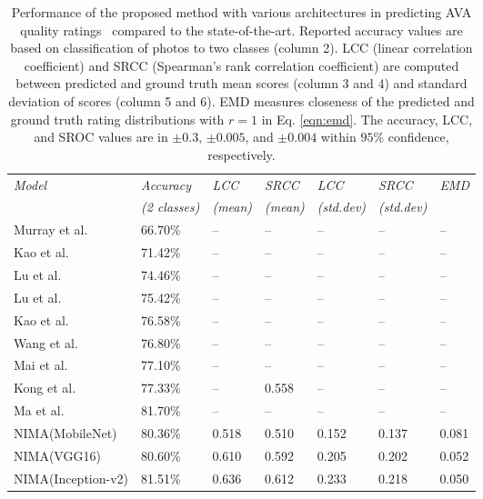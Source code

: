 \documentclass[10pt,twocolumn,twoside]{IEEEtran}
\begin{document}
\begin{table*}[!t]
\vspace{12 mm}
\begin{center}
\captionsetup{width=0.57\textwidth}
\caption{Performance of the proposed method with various architectures in predicting AVA quality ratings~\cite{murray2012ava} compared to the state-of-the-art. Reported accuracy values are based on classification of photos to two classes (column 2). LCC (linear correlation coefficient) and SRCC (Spearman's rank correlation coefficient) are computed between predicted and ground truth mean scores (column 3 and 4) and standard deviation of scores (column 5 and 6). EMD measures closeness of the predicted and ground truth rating distributions with $r=1$ in Eq. \ref{eqn:emd}. The accuracy, LCC, and SROC values are in $\pm0.3$,  $\pm0.005$, and $\pm0.004$ within $95\%$ confidence, respectively.}
\begin{tabular}{@{} *7l @{}}    \toprule
\emph{Model} & \emph{Accuracy} & \emph{LCC} & \emph{SRCC} & \emph{LCC} & \emph{SRCC} & \emph{EMD} \\
  & \emph{(2 classes)} & \emph{(mean)} & \emph{(mean)} & \emph{(std.dev)} & \emph{(std.dev)}\\\midrule
Murray et al.~\cite{murray2012ava}    & 66.70\% &  --  &  -- &  --  &  -- &  --   \\ 
Kao et al.~\cite{kao2015visual}    & 71.42\% &  --  &  --  &  --  &  --  &  --  \\ 
Lu et al. \cite{lu2014rapid}    & 74.46\%  & -- &  --  &  --  &  --  &  --  \\ 
Lu et al. \cite{lu2015rating}    & 75.42\%  & -- &  --  &  --  &  --  &  --  \\ 
Kao et al. \cite{kao2016visual}    & 76.58\% & -- &  --  &  --  &  -- &  --   \\ 
Wang et al. \cite{wang2016brain}    & 76.80\% & -- &  --  &  --  &  --  &  --  \\ 
Mai et al. \cite{mai2016composition}    & 77.10\%  & -- &  -- &  --  &  --  &  --  \\ 
Kong et al. \cite{kong2016photo}  &  77.33\% & --  & 0.558 &  --  &  --  &  --  \\
Ma et al. \cite{ma2017lamp} & 81.70\% & -- &  -- &  --  &  --  &  --  \\ \hdashline
NIMA(MobileNet)  & 80.36\%  & 0.518 & 0.510 &  0.152 &  0.137 &  0.081 \\
NIMA(VGG16)  & 80.60\%  & 0.610 & 0.592 &  0.205 &  0.202 &  0.052 \\
NIMA(Inception-v2)  & 81.51\%  & 0.636 & 0.612 &  0.233 &  0.218 &  0.050 \\\bottomrule
 \hline
\end{tabular}
\label{tab:ava_comp}
\end{center}
\end{table*}
\end{document}
